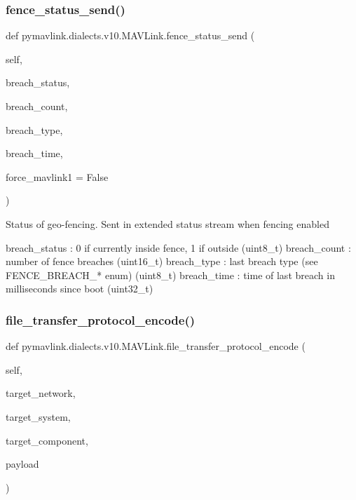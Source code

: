\begin{DoxyVerb}
\begin{DoxyVerb}
\subsubsection{\texorpdfstring{fence\+\_\+status\+\_\+send()}{fence\_status\_send()}}
{\footnotesize\ttfamily def pymavlink.\+dialects.\+v10.\+M\+A\+V\+Link.\+fence\+\_\+status\+\_\+send (\begin{DoxyParamCaption}\item[{}]{self,  }\item[{}]{breach\+\_\+status,  }\item[{}]{breach\+\_\+count,  }\item[{}]{breach\+\_\+type,  }\item[{}]{breach\+\_\+time,  }\item[{}]{force\+\_\+mavlink1 = {\ttfamily False} }\end{DoxyParamCaption})}

\begin{DoxyVerb}Status of geo-fencing. Sent in extended status stream when fencing
enabled

breach_status             : 0 if currently inside fence, 1 if outside (uint8_t)
breach_count              : number of fence breaches (uint16_t)
breach_type               : last breach type (see FENCE_BREACH_* enum) (uint8_t)
breach_time               : time of last breach in milliseconds since boot (uint32_t)\end{DoxyVerb}
 \mbox{\label{classpymavlink_1_1dialects_1_1v10_1_1MAVLink_ad2ebf58a4d5441d54d257f716c2c857b}} 
\subsubsection{\texorpdfstring{file\+\_\+transfer\+\_\+protocol\+\_\+encode()}{file\_transfer\_protocol\_encode()}}
{\footnotesize\ttfamily def pymavlink.\+dialects.\+v10.\+M\+A\+V\+Link.\+file\+\_\+transfer\+\_\+protocol\+\_\+encode (\begin{DoxyParamCaption}\item[{}]{self,  }\item[{}]{target\+\_\+network,  }\item[{}]{target\+\_\+system,  }\item[{}]{target\+\_\+component,  }\item[{}]{payload }\end{DoxyParamCaption})}


\end{DoxyVerb}
\end{DoxyVerb}

